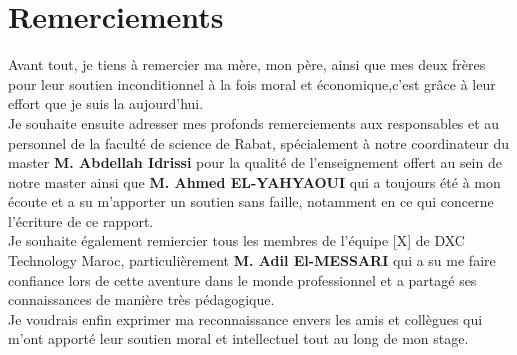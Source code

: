 \chapter*{\vspace{1.2in} Remerciements }
\vspace{0.5in}


Avant tout, je tiens à remercier ma mère, mon père, ainsi que mes deux frères pour leur soutien inconditionnel à la fois moral et économique,c’est grâce à leur effort que je suis la aujourd’hui. \\

Je souhaite ensuite adresser mes profonds remerciements aux responsables et au personnel de la faculté de science de Rabat, spécialement à notre coordinateur du master \textbf{M. Abdellah Idrissi} pour la qualité de l’enseignement offert au sein de notre master ainsi que \textbf{M. Ahmed EL-YAHYAOUI} qui a toujours été à mon écoute et a su m’apporter un soutien sans faille, notamment en ce qui concerne l’écriture de ce rapport. \\

Je souhaite également remiercier tous les membres de l’équipe [X] de DXC Technology Maroc, particulièrement \textbf{M. Adil El-MESSARI} qui a su me faire confiance lors de cette aventure dans le monde professionnel et a partagé ses connaissances de manière très pédagogique.\\ %

Je voudrais enfin exprimer ma reconnaissance envers les amis et collègues qui m’ont apporté leur soutien moral et intellectuel tout au long de mon stage.



